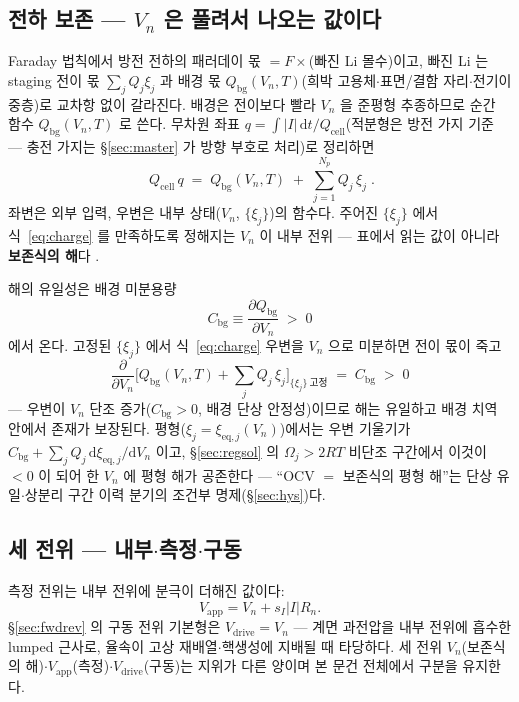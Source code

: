 \documentclass[11pt,a4paper]{article}
\newcommand{\dd}{\mathrm{d}}
\newcommand{\eq}{\mathrm{eq}}
\newcommand{\app}{\mathrm{app}}
\newcommand{\drive}{\mathrm{drive}}
\newcommand{\cell}{\mathrm{cell}}
\newcommand{\bg}{\mathrm{bg}}
\begin{document}
\subsection{전하 보존 — $V_n$ 은 풀려서 나오는 값이다}
Faraday 법칙에서 방전 전하의 패러데이 몫 $=F\times$(빠진 Li 몰수)이고, 빠진 Li 는 staging 전이 몫 $\sum_jQ_j\xi_j$ 과 배경 몫 $Q_\bg(V_n,T)$(희박 고용체$\cdot$표면/결함 자리$\cdot$전기이중층)로 교차항 없이 갈라진다. 배경은 전이보다 빨라 $V_n$ 을 준평형 추종하므로 순간 함수 $Q_\bg(V_n,T)$ 로 쓴다. 무차원 좌표 $q=\int|I|\,\dd t/Q_\cell$(적분형은 방전 가지 기준 — 충전 가지는 \S\ref{sec:master} 가 방향 부호로 처리)로 정리하면
\begin{equation}
\boxed{\;Q_\cell\,q\;=\;Q_\bg(V_n,T)\;+\;\sum_{j=1}^{N_p}Q_j\,\xi_j\;.}
\label{eq:charge}
\end{equation}
좌변은 외부 입력, 우변은 내부 상태($V_n$, $\{\xi_j\}$)의 함수다. 주어진 $\{\xi_j\}$ 에서 식~\eqref{eq:charge} 를 만족하도록 정해지는 $V_n$ 이 내부 전위 — 표에서 읽는 값이 아니라 \textbf{보존식의 해}다 \cite{mckinnon1983,newman2004}.

해의 유일성은 배경 미분용량
\begin{equation}
C_\bg\equiv\frac{\partial Q_\bg}{\partial V_n}\;>\;0
\label{eq:cbg}
\end{equation}
에서 온다. 고정된 $\{\xi_j\}$ 에서 식~\eqref{eq:charge} 우변을 $V_n$ 으로 미분하면 전이 몫이 죽고
\begin{equation}
\frac{\partial}{\partial V_n}\Big[Q_\bg(V_n,T)+\sum_jQ_j\,\xi_j\Big]_{\{\xi_j\}\ \text{고정}}
\;=\;C_\bg\;>\;0
\label{eq:unique}
\end{equation}
— 우변이 $V_n$ 단조 증가($C_\bg>0$, 배경 단상 안정성)이므로 해는 유일하고 배경 치역 안에서 존재가 보장된다. 평형($\xi_j=\xi_{\eq,j}(V_n)$)에서는 우변 기울기가 $C_\bg+\sum_jQ_j\,\dd\xi_{\eq,j}/\dd V_n$ 이고, \S\ref{sec:regsol} 의 $\Omega_j>2RT$ 비단조 구간에서 이것이 $<0$ 이 되어 한 $V_n$ 에 평형 해가 공존한다 — ``OCV $=$ 보존식의 평형 해''는 단상 유일$\cdot$상분리 구간 이력 분기의 조건부 명제(\S\ref{sec:hys})다.

\subsection{세 전위 — 내부$\cdot$측정$\cdot$구동}
측정 전위는 내부 전위에 분극이 더해진 값이다:
\begin{equation}
V_\app=V_n+s_I|I|R_n.
\label{eq:vapp}
\end{equation}
\S\ref{sec:fwdrev} 의 구동 전위 기본형은 $V_\drive=V_n$ — 계면 과전압을 내부 전위에 흡수한 lumped 근사로, 율속이 고상 재배열$\cdot$핵생성에 지배될 때 타당하다. 세 전위 $V_n$(보존식의 해)$\cdot$$V_\app$(측정)$\cdot$$V_\drive$(구동)는 지위가 다른 양이며 본 문건 전체에서 구분을 유지한다.
\end{document}
